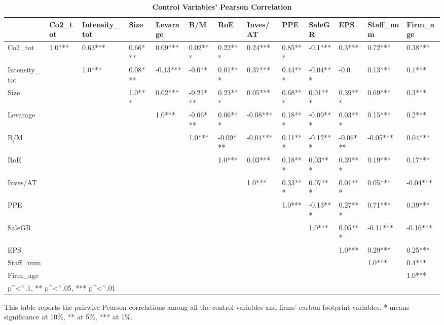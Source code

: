 \documentclass[12pt]{article}
\begin{document}
\begin{landscape}
\begin{table}[!ht]
\scriptsize
\centering
\def\sym#1{\ifmmode^{#1}\else\(^{#1}\)\fi}
\caption{\textbf{Control Variables' Pearson Correlation}}
\label{tab: corr}
\begin{tabular}{lllllllllllll}
\toprule
 & Co2\_tot & Intensity\_tot & Size & Levarage & B/M & RoE & Inves/AT & PPE & SaleGR & EPS & Staff\_num & Firm\_age \\
\midrule
Co2\_tot & 1.0*** & 0.63*** & 0.66*** & 0.09*** & 0.02*** & 0.22*** & 0.24*** & 0.85*** & -0.1*** & 0.3*** & 0.72*** & 0.38*** \\
Intensity\_tot &  & 1.0*** & 0.08*** & -0.13*** & -0.0** & 0.01*** & 0.37*** & 0.44*** & -0.04*** & -0.0 & 0.13*** & 0.1*** \\
Size &  &  & 1.0*** & 0.02*** & -0.21*** & 0.23*** & 0.05*** & 0.68*** & 0.01*** & 0.39*** & 0.69*** & 0.3*** \\
Levarage &  &  &  & 1.0*** & -0.06*** & 0.06*** & -0.08*** & 0.18*** & -0.09*** & 0.03*** & 0.15*** & 0.2*** \\
B/M &  &  &  &  & 1.0*** & -0.09*** & -0.04*** & 0.11*** & -0.12*** & -0.06*** & -0.05*** & 0.04*** \\
RoE &  &  &  &  &  & 1.0*** & 0.03*** & 0.18*** & 0.03*** & 0.39*** & 0.19*** & 0.17*** \\
Inves/AT &  &  &  &  &  &  & 1.0*** & 0.33*** & 0.07*** & 0.01*** & 0.05*** & -0.04*** \\
PPE &  &  &  &  &  &  &  & 1.0*** & -0.13*** & 0.27*** & 0.71*** & 0.39*** \\
SaleGR &  &  &  &  &  &  &  &  & 1.0*** & 0.05*** & -0.11*** & -0.16*** \\
EPS &  &  &  &  &  &  &  &  &  & 1.0*** & 0.29*** & 0.25*** \\
Staff\_num &  &  &  &  &  &  &  &  &  &  & 1.0*** & 0.4*** \\
Firm\_age &  &  &  &  &  &  &  &  &  &  &  & 1.0*** \\
\bottomrule
\multicolumn{7}{l}{\footnotesize * p\sym{<}.1, ** p\sym{<}.05, *** p\sym{<}.01}
\end{tabular}
\begin{tablenotes}
    \item This table reports the pairwise Pearson correlations among all the control variables and firms' carbon footprint variables. * means significance at 10\%, ** at 5\%, *** at 1\%.
\end{tablenotes}
\end{table}
\end{landscape}
\end{document}
